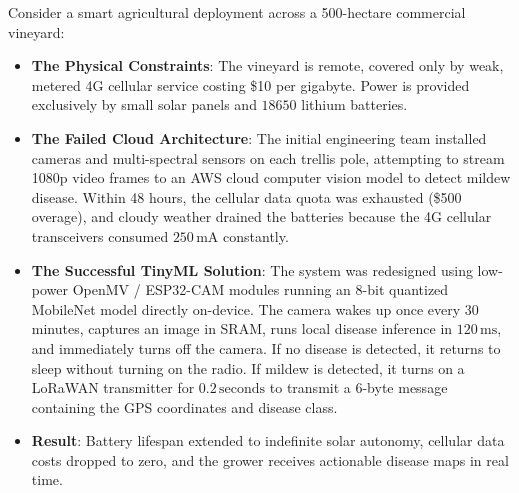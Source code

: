 \begin{iotbox}
Consider a smart agricultural deployment across a 500-hectare commercial vineyard:
\begin{itemize}
    \item \textbf{The Physical Constraints}: The vineyard is remote, covered only by weak, metered 4G cellular service costing \$10 per gigabyte. Power is provided exclusively by small solar panels and $18650$ lithium batteries.
    \item \textbf{The Failed Cloud Architecture}: The initial engineering team installed cameras and multi-spectral sensors on each trellis pole, attempting to stream 1080p video frames to an AWS cloud computer vision model to detect mildew disease. Within 48 hours, the cellular data quota was exhausted (\$500 overage), and cloudy weather drained the batteries because the 4G cellular transceivers consumed $250\,\text{mA}$ constantly.
    \item \textbf{The Successful TinyML Solution}: The system was redesigned using low-power OpenMV / ESP32-CAM modules running an 8-bit quantized MobileNet model directly on-device. The camera wakes up once every 30 minutes, captures an image in SRAM, runs local disease inference in $120\,\text{ms}$, and immediately turns off the camera. If no disease is detected, it returns to sleep without turning on the radio. If mildew is detected, it turns on a LoRaWAN transmitter for $0.2\,\text{seconds}$ to transmit a 6-byte message containing the GPS coordinates and disease class.
    \item \textbf{Result}: Battery lifespan extended to indefinite solar autonomy, cellular data costs dropped to zero, and the grower receives actionable disease maps in real time.
\end{itemize}
\end{iotbox}

